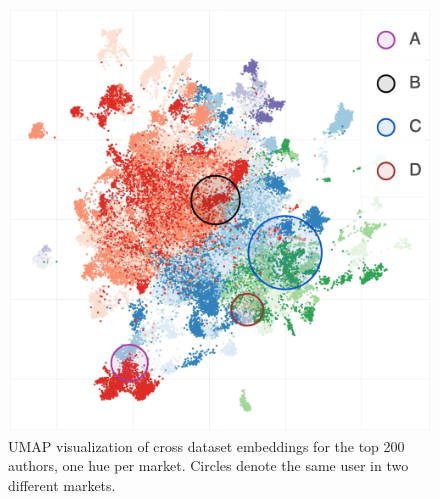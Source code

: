 \begin{figure}
    \centering
    \includegraphics[width=\linewidth]{sysml/plots/cross_study.png}
    \caption{UMAP visualization of cross dataset embeddings for the top 200 authors, one hue per market. Circles denote the same user in two different markets. 
    }
    \label{fig:cross_dataset}
\end{figure}


